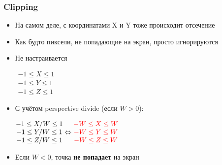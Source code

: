 \documentclass[10pt]{beamer}
\begin{document}
\begin{frame}[fragile]
\frametitle{Clipping}
\begin{itemize}
\item На самом деле, с координатами X и Y тоже происходит отсечение
\pause
\item Как будто пиксели, не попадающие на экран, просто игнорируются
\pause
\item Не настраивается
\pause

\begin{center}
\begin{math}
\begin{matrix}
-1 \leq X \leq 1 \\
-1 \leq Y \leq 1 \\
-1 \leq Z \leq 1
\end{matrix}
\end{math}
\end{center}

\pause
\item С учётом perspective divide (если \begin{math}W>0\end{math}):

\begin{center}
\begin{math}
\begin{matrix}
-1 \leq X/W \leq 1 \\
-1 \leq Y/W \leq 1 \\
-1 \leq Z/W \leq 1
\end{matrix}
\Leftrightarrow
\color{red}
\begin{matrix}
-W \leq X \leq W \\
-W \leq Y \leq W \\
-W \leq Z \leq W
\end{matrix}
\end{math}
\end{center}

\pause
\item Если \begin{math}W<0\end{math}, точка \textbf{\alert{не попадает}} на экран
\end{itemize}

\end{frame}
\end{document}
